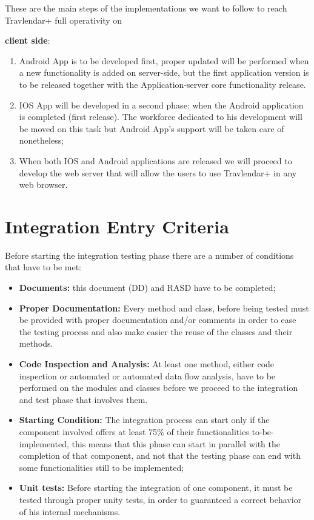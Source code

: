 These are the main steps of the implementations we want to follow to reach Travlendar+ full operativity on\begin{large}
\textbf{client side}:
\end{large}
\begin{enumerate}
\item Android App is to be developed first, proper updated will be performed when a new functionality is added on server-side, but the first application version is to be released together with the Application-server core functionality release.
\item IOS App will be developed in a second phase: when the Android application is completed (first release). The workforce dedicated to his development will be moved on this task but Android App's support will be taken care of nonetheless;
\item When both IOS and Android applications are released we will proceed to develop the web server that will allow the users to use Travlendar+ in any web browser.
\end{enumerate}

\section{Integration Entry Criteria}
Before starting the integration testing phase there are a number of conditions that have to be met:
\begin{itemize}
\item \textbf{Documents:} this document (DD) and RASD have to be completed;
\item \textbf{Proper Documentation:} Every method and class, before being tested must be provided with proper documentation and/or comments in order to ease the testing process and also make easier the reuse of the classes and their methods.
\item \textbf{Code Inspection and Analysis:} At least one method, either code inspection or automated or automated data flow analysis, have to be performed on the modules and classes before we proceed to the integration and test phase that involves them.
\item \textbf{Starting Condition:} The integration process can start only if the component involved offers at least 75\% of their functionalities to-be-implemented, this means that this phase can start in parallel with the completion of that component, and not that the testing phase can end with some functionalities still to be implemented; 
\item \textbf{Unit tests:} Before starting the integration of one component, it must be tested through proper unity tests, in order to guaranteed a correct behavior of his internal mechanisms.
\end{itemize}
